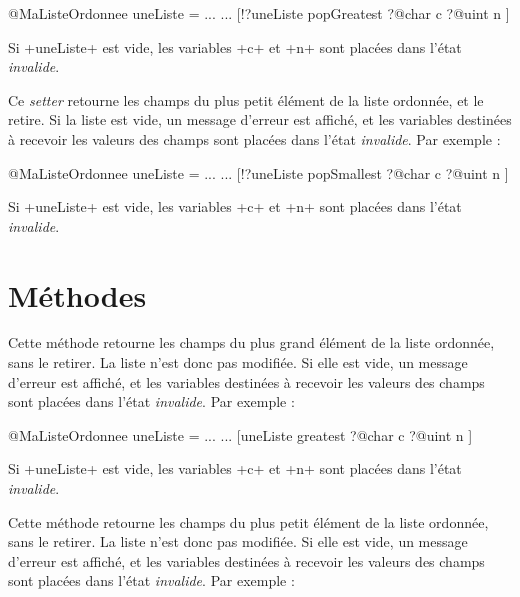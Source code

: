 \begin{galgas3}
@MaListeOrdonnee uneListe = ...
...
[!?uneListe popGreatest
  ?@char c
  ?@uint n
]
\end{galgas3}

Si \ggst+uneListe+ est vide, les variables \ggst+c+ et \ggst+n+ sont placées dans l'état \emph{invalide}.



Ce \emph{setter} retourne les champs du plus petit élément de la liste ordonnée, et le retire. Si la liste est vide, un message d'erreur est affiché, et les variables destinées à recevoir les valeurs des champs sont placées dans l'état \emph{invalide}. Par exemple :

\begin{galgas3}
@MaListeOrdonnee uneListe = ...
...
[!?uneListe popSmallest
  ?@char c
  ?@uint n
]
\end{galgas3}

Si \ggst+uneListe+ est vide, les variables \ggst+c+ et \ggst+n+ sont placées dans l'état \emph{invalide}.










\section{Méthodes}


Cette méthode retourne les champs du plus grand élément de la liste ordonnée, sans le retirer. La liste n'est donc pas modifiée. Si elle est vide, un message d'erreur est affiché, et les variables destinées à recevoir les valeurs des champs sont placées dans l'état \emph{invalide}. Par exemple :

\begin{galgas3}
@MaListeOrdonnee uneListe = ...
...
[uneListe greatest
  ?@char c
  ?@uint n
]
\end{galgas3}

Si \ggst+uneListe+ est vide, les variables \ggst+c+ et \ggst+n+ sont placées dans l'état \emph{invalide}.



Cette méthode retourne les champs du plus petit élément de la liste ordonnée, sans le retirer. La liste n'est donc pas modifiée. Si elle est vide, un message d'erreur est affiché, et les variables destinées à recevoir les valeurs des champs sont placées dans l'état \emph{invalide}. Par exemple :

